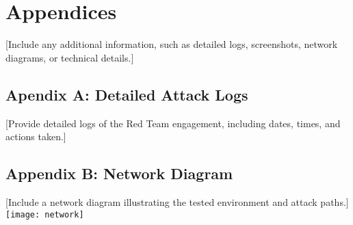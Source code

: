 \section{Appendices}
[Include any additional information, such as detailed logs, screenshots, network diagrams, or technical details.]
\subsection{Apendix A: Detailed Attack Logs}
[Provide detailed logs of the Red Team engagement, including dates, times, and actions taken.]
% 
% 
\subsection{Appendix B: Network Diagram}
[Include a network diagram illustrating the tested environment and attack paths.]\\
\texttt{[image: network]}
